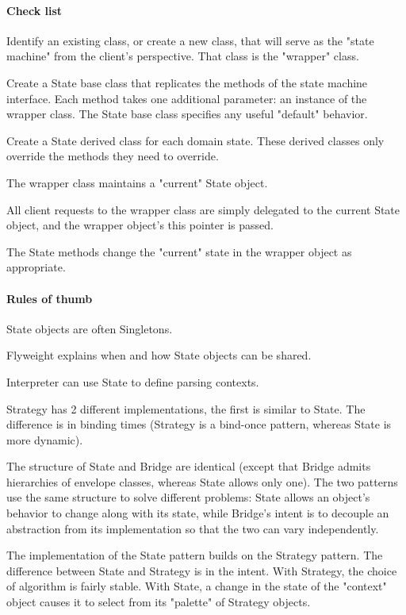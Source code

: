 \documentclass{book}
\begin{document}
\paragraph{Check list}

    Identify an existing class, or create a new class, that will serve as the "state machine" from the client's perspective. That class is the "wrapper" class.

    Create a State base class that replicates the methods of the state machine interface.
    Each method takes one additional parameter: an instance of the wrapper class. The State base class specifies any useful "default" behavior.

    Create a State derived class for each domain state. These derived classes only override the methods they need to override.

    The wrapper class maintains a "current" State object.

    All client requests to the wrapper class are simply delegated to the current State object, and the wrapper object's this pointer is passed.

    The State methods change the "current" state in the wrapper object as appropriate.

\paragraph{Rules of thumb}
    State objects are often Singletons.

    Flyweight explains when and how State objects can be shared.

    Interpreter can use State to define parsing contexts.

    Strategy has 2 different implementations, the first is similar to State. The difference is in binding times (Strategy is a bind-once pattern, whereas State is more dynamic).

    The structure of State and Bridge are identical (except that Bridge admits hierarchies of envelope classes, whereas State allows only one).
    The two patterns use the same structure to solve different problems: State allows an object's behavior to change along with its state,
    while Bridge's intent is to decouple an abstraction from its implementation so that the two can vary independently.

    The implementation of the State pattern builds on the Strategy pattern.
    The difference between State and Strategy is in the intent. With Strategy, the choice of algorithm is fairly stable.
    With State, a change in the state of the "context" object causes it to select from its "palette" of Strategy objects.
\end{document}
